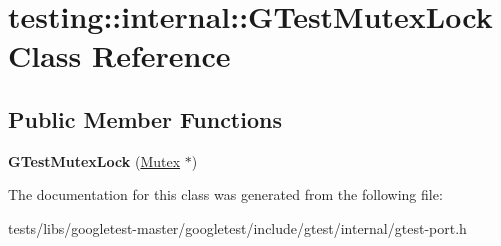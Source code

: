 \hypertarget{classtesting_1_1internal_1_1GTestMutexLock}{}\section{testing\+:\+:internal\+:\+:G\+Test\+Mutex\+Lock Class Reference}
\label{classtesting_1_1internal_1_1GTestMutexLock}
\subsection*{Public Member Functions}
\begin{DoxyCompactItemize}
\item 
\mbox{\label{classtesting_1_1internal_1_1GTestMutexLock_a77e3cba326d5356b4a1dea3790559c26}} 
{\bfseries G\+Test\+Mutex\+Lock} (\hyperlink{classtesting_1_1internal_1_1Mutex}{Mutex} $\ast$)
\end{DoxyCompactItemize}


The documentation for this class was generated from the following file\+:\begin{DoxyCompactItemize}
\item 
tests/libs/googletest-\/master/googletest/include/gtest/internal/gtest-\/port.\+h\end{DoxyCompactItemize}

